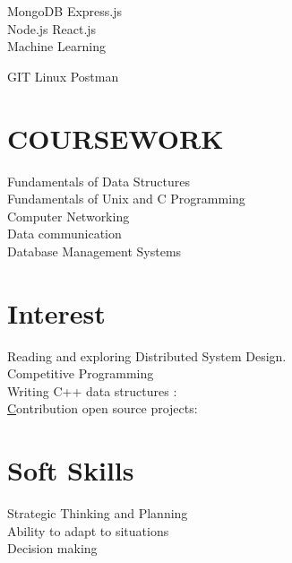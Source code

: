 \documentclass[]{deedy-resume-openfont}
\begin{document}
\begin{minipage}[t]{0.33\textwidth}
 \textbullet{} MongoDB 
\textbullet{}Express.js  \\ \textbullet{} Node.js
\textbullet{} React.js\\  \textbullet{} Machine Learning
 
 
 \textbullet{} GIT \textbullet{}Linux \textbullet{}Postman
\sectionsep


\section{COURSEWORK}
\textbullet{}Fundamentals of Data Structures\\
\textbullet{}Fundamentals of Unix and C
 Programming \\
\textbullet{}Computer Networking\\
\textbullet{}Data communication \\
\textbullet{}Database Management Systems\\



\section{Interest}
\textbullet{}Reading and exploring Distributed System Design.\\
\textbullet{}Competitive Programming\\
\textbullet{}Writing C++ data structures : \href{https://github.com/llucifer97/Algorithms-Datastructure}{}\\
\textbullet{}\href{}Contribution open source projects: \href{https://github.com/pulls?q=is%3Apr+author%3Allucifer97+archived%3Afalse+is%3Aclosed}{\custombold{Link}}\\



 \section{Soft Skills}
 \textbullet{}Strategic Thinking and Planning\\
\textbullet{}Ability to adapt to situations\\
 \textbullet{}Decision making
 \sectionsep
%
%

\end{minipage} 
\end{document}
